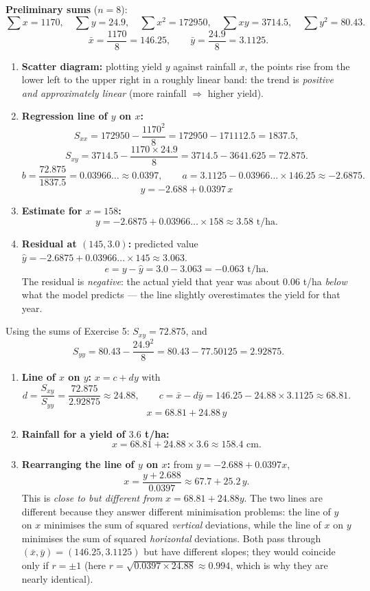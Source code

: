 \documentclass[11pt]{article}
\begin{document}
\begin{corrige}
\textbf{Preliminary sums} ($n = 8$):
\[
\sum x = 1170,\quad \sum y = 24.9,\quad \sum x^2 = 172950,\quad \sum xy = 3714.5,\quad \sum y^2 = 80.43.
\]
\[
\bar{x} = \frac{1170}{8} = 146.25, \qquad \bar{y} = \frac{24.9}{8} = 3.1125.
\]
\begin{enumerate}
\item \textbf{Scatter diagram:} plotting yield $y$ against rainfall $x$, the points rise from the lower left to the upper right in a roughly linear band: the trend is \emph{positive and approximately linear} (more rainfall $\Rightarrow$ higher yield).
\item \textbf{Regression line of $y$ on $x$:}
\[
S_{xx} = 172950 - \frac{1170^2}{8} = 172950 - 171112.5 = 1837.5,
\]
\[
S_{xy} = 3714.5 - \frac{1170 \times 24.9}{8} = 3714.5 - 3641.625 = 72.875.
\]
\[
b = \frac{72.875}{1837.5} = 0.03966\ldots \approx 0.0397, \qquad a = 3.1125 - 0.03966\ldots \times 146.25 \approx -2.6875.
\]
\[
\boxed{y = -2.688 + 0.0397\,x}
\]
\item \textbf{Estimate for $x = 158$:}
\[
y = -2.6875 + 0.03966\ldots \times 158 \approx 3.58 \text{ t/ha}.
\]
\item \textbf{Residual at $(145, 3.0)$:} predicted value $\hat{y} = -2.6875 + 0.03966\ldots \times 145 \approx 3.063$.
\[
e = y - \hat{y} = 3.0 - 3.063 = -0.063 \text{ t/ha}.
\]
The residual is \emph{negative}: the actual yield that year was about $0.06$ t/ha \emph{below} what the model predicts — the line slightly overestimates the yield for that year.
\end{enumerate}
\end{corrige}

\begin{corrige}
Using the sums of Exercise 5: $S_{xy} = 72.875$, and
\[
S_{yy} = 80.43 - \frac{24.9^2}{8} = 80.43 - 77.50125 = 2.92875.
\]
\begin{enumerate}
\item \textbf{Line of $x$ on $y$:} $x = c + dy$ with
\[
d = \frac{S_{xy}}{S_{yy}} = \frac{72.875}{2.92875} \approx 24.88, \qquad c = \bar{x} - d\bar{y} = 146.25 - 24.88 \times 3.1125 \approx 68.81.
\]
\[
\boxed{x = 68.81 + 24.88\,y}
\]
\item \textbf{Rainfall for a yield of $3.6$ t/ha:}
\[
x = 68.81 + 24.88 \times 3.6 \approx 158.4 \text{ cm}.
\]
\item \textbf{Rearranging the line of $y$ on $x$:} from $y = -2.688 + 0.0397x$,
\[
x = \frac{y + 2.688}{0.0397} \approx 67.7 + 25.2\,y.
\]
This is \emph{close to but different from} $x = 68.81 + 24.88y$. The two lines are different because they answer different minimisation problems: the line of $y$ on $x$ minimises the sum of squared \emph{vertical} deviations, while the line of $x$ on $y$ minimises the sum of squared \emph{horizontal} deviations. Both pass through $(\bar{x}, \bar{y}) = (146.25, 3.1125)$ but have different slopes; they would coincide only if $r = \pm 1$ (here $r = \sqrt{0.0397 \times 24.88} \approx 0.994$, which is why they are nearly identical).
\end{enumerate}
\end{corrige}
\end{document}
